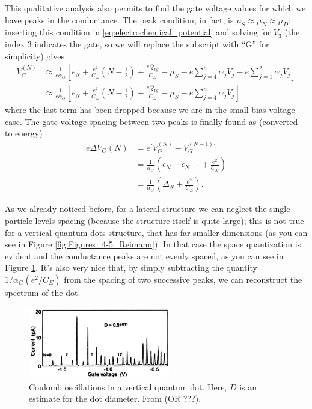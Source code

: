 \documentclass[a4paper,twoside,11pt]{book}
\begin{document}
This qualitative analysis also permits to find the gate voltage values for which we have peaks in the conductance. The peak condition, in fact, is $\mu_S\approx\mu_N\approx\mu_D$; inserting this condition in \eqref{eq:electrochemical_potential} and solving for $V_3$ (the index 3 indicates the gate, so we will replace the subscript with ``G'' for simplicity) gives
\begin{align}
	V_G^{(N)}
	&\approx \frac{1}{e\alpha_G}\left[ \epsilon_N + \frac{e^2}{C_{\Sigma}}\left(N-\frac{1}{2}\right) + \frac{eQ_{\text{bg}}}{C_{\Sigma}} - \mu_S - e\sum_{j=4}^{n}\alpha_jV_j - e\sum_{j=1}^{2}\alpha_jV_j \right] \\
	&\approx \frac{1}{e\alpha_G}\left[ \epsilon_N + \frac{e^2}{C_{\Sigma}}\left(N-\frac{1}{2}\right) + \frac{eQ_{\text{bg}}}{C_{\Sigma}} - \mu_S - e\sum_{j=4}^{n}\alpha_jV_j \right]
\end{align}
where the last term has been dropped because we are in the small-bias voltage case. The gate-voltage spacing between two peaks is finally found as (converted to energy)
\begin{align}
	e\Delta V_G(N) 
	&= e\Big[V_G^{(N)}-V_G^{(N-1)}\Big] \\
	&= \frac{1}{\alpha_G}\left( \epsilon_N - \epsilon_{N-1} + \frac{e^2}{C_{\Sigma}} \right) \\
	&= \frac{1}{\alpha_G}\left( \Delta_N + \frac{e^2}{C_{\Sigma}} \right).
	\label{eq:DeltaVG_N_Vb0}
\end{align}

As we already noticed before, for a lateral structure we can neglect the single-particle levels spacing (because the structure itself is quite large); this is not true for a vertical quantum dots structure, that has far smaller dimensions (as you can see in Figure \ref{fig:Figures_4-5_Reimann}). In that case the space quantization is evident and the conductance peaks are not evenly spaced, as you can see in Figure \ref{fig:Figure_10_Reimann}. It's also very nice that, by simply subtracting the quantity $1 / \alpha_G (e^2 / C_{\Sigma})$ from the spacing of two successive peaks, we can reconstruct the spectrum of the dot.

\begin{figure}[h]%
	\centering
    \includegraphics[width=0.55\textwidth]{Figure_10_Reimann}
    \caption{Coulomb oscillations in a vertical quantum dot. Here, $D$ is an estimate for the dot diameter. From \cite{Reimann2002} (OR \cite{Tarucha1996} ???).}
	\label{fig:Figure_10_Reimann}
\end{figure}
\end{document}
